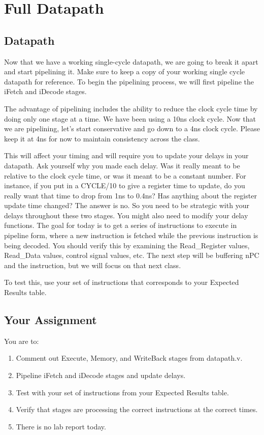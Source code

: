 \chapter{Full Datapath}


\section{Datapath}
Now that we have a working single-cycle datapath, we are going to break it apart and start pipelining it.  Make sure to keep a copy of your working single cycle datapath for reference.  To begin the pipelining process, we will first pipeline the iFetch and iDecode stages.

The advantage of pipelining includes the ability to reduce the clock cycle time by doing only one stage at a time.  We have been using a 10ns clock cycle.  Now that we are pipelining, let's start conservative and go down to a 4ns clock cycle.  Please keep it at 4ns for now to maintain consistency across the class.  

This will affect your timing and will require you to update your delays in your datapath.  Ask yourself why you made each delay.  Was it really meant to be relative to the clock cycle time, or was it meant to be a constant number. For instance, if you put in a CYCLE/10 to give a register time to update, do you really want that time to drop from 1ns to 0.4ns?  Has anything about the register update time changed?  The answer is no.  So you need to be strategic with your delays throughout these two stages.  You might also need to modify your delay functions.  The goal for today is to get a series of instructions to execute in pipeline form, where a new instruction is fetched while the previous instruction is being decoded.  You should verify this by examining the Read\_Register values, Read\_Data values, control signal values, etc.  The next step will be buffering nPC and the instruction, but we will focus on that next class.

To test this, use your set of instructions that corresponds to your Expected Results table.

\section{Your Assignment}

You are to:
\begin{enumerate}
\item Comment out Execute, Memory, and WriteBack stages from datapath.v.
\item Pipeline iFetch and iDecode stages and update delays.   
\item Test with your set of instructions from your Expected Results table.
\item Verify that stages are processing the correct instructions at the correct times.
\item There is no lab report today.
\end{enumerate} 